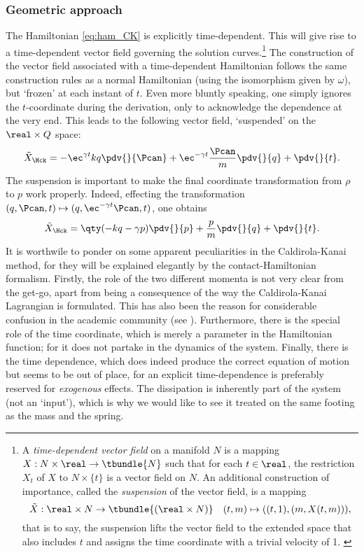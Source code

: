 \subsubsection{Geometric approach}
The Hamiltonian \cref{eq:ham_CK} is explicitly time-dependent. This will give rise to a time-dependent vector field governing the solution curves.\footnote
{A \emph{time-dependent vector field} on a manifold $N$ is a mapping $X: N\times\real \to \tbundle{N}$ such that for each $t \in \real$, the restriction $X_t$ of $X$ to $N \times \{t\}$ is a vector field on $N$. \cite{Libermann1987} An additional construction of importance, called the \emph{suspension} of the vector field, is a mapping $$ \tilde{X}: \real \times N \to \tbundle{(\real \times N)} \quad (t, m) \mapsto ((t, 1), (m, X(t, m))),$$ that is to say, the suspension lifts the vector field to the extended space that also includes $t$ and assigns the time coordinate with a trivial velocity of 1. \cite{Abraham1978}}
The construction of the vector field associated with a time-dependent Hamiltonian follows the same construction rules as a normal Hamiltonian (using the isomorphism given by $\omega$), but `frozen' at each instant of $t$. Even more bluntly speaking, one simply ignores the $t$-coordinate during the derivation, only to acknowledge the dependence at the very end. This leads to the following vector field, `suspended' on the $\real\times Q$ space:
$$ \tilde{X}_{\Hck} = -\ec^{\gamma t}kq\pdv{}{\Pcan} + \ec^{-\gamma t}\frac{\Pcan}{m}\pdv{}{q} + \pdv{}{t}.$$
The suspension is important to make the final coordinate transformation from $\rho$ to $p$ work properly. Indeed, effecting the transformation $(q, \Pcan, t) \mapsto (q, \ec^{-\gamma t}\Pcan, t)$, one obtains
$$ \tilde{X}_{\Hck} = \qty(-kq - \gamma p)\pdv{}{p} + \frac{p}{m}\pdv{}{q} + \pdv{}{t}.$$
It is worthwile to ponder on some apparent peculiarities in the Caldirola-Kanai method, for they will be explained elegantly by the contact-Hamiltonian formalism. Firstly, the role of the two different momenta is not very clear from the get-go, apart from being a consequence of the way the Caldirola-Kanai Lagrangian is formulated. This has also been the reason for considerable confusion in the academic community (see \citet{Schuch1997}). Furthermore, there is the special role of the time coordinate, which is merely a parameter in the Hamiltonian function; for it does not partake in the dynamics of the system. Finally, there is the time dependence, which does indeed produce the correct equation of motion but seems to be out of place, for an explicit time-dependence is preferably reserved for \emph{exogenous} effects. The dissipation is inherently part of the system (not an `input'), which is why we would like to see it treated on the same footing as the mass and the spring.

